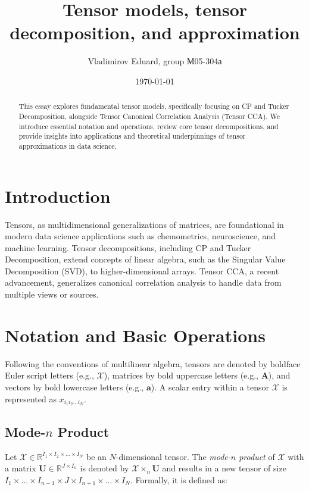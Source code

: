 \documentclass[a4paper,14pt]{article}
\author{Vladimirov Eduard, group М05-304а}
\title{\textbf{Tensor models, tensor decomposition, and approximation}}
\date{\today}
\theoremstyle{plain} %
\theoremstyle{definition} %
\theoremstyle{remark} %
\theoremstyle{definition}
\theoremstyle{remark}
\theoremstyle{remark}
\begin{document}
	\maketitle
	
	\begin{abstract}
		This essay explores fundamental tensor models, specifically focusing on CP and Tucker Decomposition, alongside Tensor Canonical Correlation Analysis (Tensor CCA). We introduce essential notation and operations, review core tensor decompositions, and provide insights into applications and theoretical underpinnings of tensor approximations in data science.
	\end{abstract}
	
	\section{Introduction}
	Tensors, as multidimensional generalizations of matrices, are foundational in modern data science applications such as chemometrics, neuroscience, and machine learning. Tensor decompositions, including CP and Tucker Decomposition, extend concepts of linear algebra, such as the Singular Value Decomposition (SVD), to higher-dimensional arrays. Tensor CCA, a recent advancement, generalizes canonical correlation analysis to handle data from multiple views or sources.
	
	\section{Notation and Basic Operations}
	Following the conventions of multilinear algebra, tensors are denoted by boldface Euler script letters (e.g., $\mathcal{X}$), matrices by bold uppercase letters (e.g., $\mathbf{A}$), and vectors by bold lowercase letters (e.g., $\mathbf{a}$). A scalar entry within a tensor $\mathcal{X}$ is represented as $x_{i_1 i_2 \dots i_N}$.
	
	\subsection{Mode-\( n \) Product}
	
	Let \(\mathcal{X} \in \mathbb{R}^{I_1 \times I_2 \times \dots \times I_N}\) be an \( N \)-dimensional tensor. The \textit{mode-\( n \) product} of \(\mathcal{X}\) with a matrix \(\mathbf{U} \in \mathbb{R}^{J \times I_n}\) is denoted by \( \mathcal{X} \times_n \mathbf{U} \) and results in a new tensor of size \(I_1 \times \dots \times I_{n-1} \times J \times I_{n+1} \times \dots \times I_N\). Formally, it is defined as:
	
\end{document}
